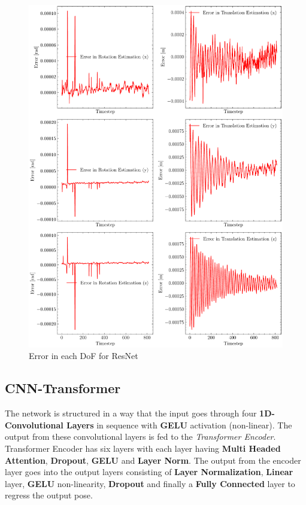 \begin{figure}[H]
    \centering
    \includegraphics[scale=0.6]{images/fig_chapter4/nn_related/error_in_predicted_vs_ground_truth_resnet.pdf}
    \caption{Error in each DoF for ResNet}
    \label{fig:resnet_error}
\end{figure}


\subsection{CNN-Transformer}
The network is structured in a way that the input goes through four \textbf{1D-Convolutional Layers} in sequence with \textbf{GELU} activation (non-linear). The output from these convolutional layers is fed to the \textit{Transformer Encoder}. Transformer Encoder has six layers with each layer having \textbf{Multi Headed Attention}, \textbf{Dropout}, \textbf{GELU} and \textbf{Layer Norm}. The output from the encoder layer goes into the output layers consisting of \textbf{Layer Normalization}, \textbf{Linear} layer, \textbf{GELU} non-linearity, \textbf{Dropout} and finally a \textbf{Fully Connected} layer to regress the output pose.

